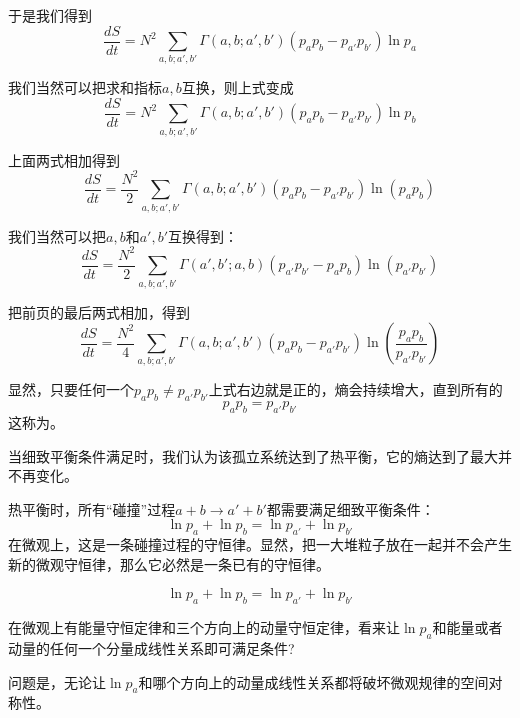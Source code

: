 \documentclass[CJK]{beamer}
\begin{document}
\begin{frame}
\bch
{\small
\bitem
\item{于是我们得到
$$\frac{d S}{dt} =  N^2 \sum_{a, b; a', b'}\Gamma(a, b; a', b') \left(p_ap_b - p_{a'}p_{b'}\right)\ln p_a    $$
}
\item{我们当然可以把求和指标$a, b$互换，则上式变成
$$\frac{d S}{dt} =  N^2 \sum_{a, b; a', b'}\Gamma(a, b; a', b') \left(p_ap_b - p_{a'}p_{b'}\right)\ln p_b    $$
}
\item{上面两式相加得到
$$\frac{d S}{dt} =  \frac{N^2}{2} \sum_{a, b; a', b'}\Gamma(a, b; a', b') \left(p_ap_b - p_{a'}p_{b'}\right)\ln(p_ap_b)    $$
}
\item{我们当然可以把$a,b$和$a',b'$互换得到：
$$\frac{d S}{dt} =  \frac{N^2}{2} \sum_{a, b; a', b'}\Gamma(a', b'; a, b) \left(p_{a'}p_{b'} - p_ap_b\right)\ln(p_{a'}p_{b'})    $$
}

\eitem
}
\ech
\end{frame}

\begin{frame}
\bch
{\small
\bitem
\item{把前页的最后两式相加，得到
$$\frac{d S}{dt} =  \frac{N^2}{4} \sum_{a, b; a', b'}\Gamma(a, b; a', b') \left(p_ap_b - p_{a'}p_{b'}\right)\ln(\frac{p_ap_b}{p_{a'}p_{b'}})    $$
}
\eitem

显然，只要任何一个$p_ap_b\ne p_{a'}p_{b'}$上式右边就是正的，熵会持续增大，直到{\blue 所有的 
$$p_ap_b = p_{a'}p_{b'}$$}
这称为{。}

当细致平衡条件满足时，我们认为该孤立系统达到了热平衡，它的熵达到了最大并不再变化。
}

\ech
\end{frame}

\begin{frame}
\bch
{
热平衡时，所有“碰撞”过程$a+b \rightarrow a'+b'$都需要满足细致平衡条件：
$$\ln p_a + \ln p_b = \ln p_{a'} + \ln p_{b'}$$
在微观上，这是一条碰撞过程的守恒律。显然，把一大堆粒子放在一起并不会产生新的微观守恒律，那么它必然是一条已有的守恒律。

}
\ech
\end{frame}

\begin{frame}
\bch

$$\ln p_a + \ln p_b = \ln p_{a'} + \ln p_{b'}$$

\skipline

在微观上有能量守恒定律和三个方向上的动量守恒定律，看来让$\ln p_a$和能量或者动量的任何一个分量成线性关系即可满足条件?

\skipline

问题是，无论让$\ln p_a$和哪个方向上的动量成线性关系都将破坏{\blue 微观规律的空间对称性}。


\ech
\end{frame}
\end{document}
